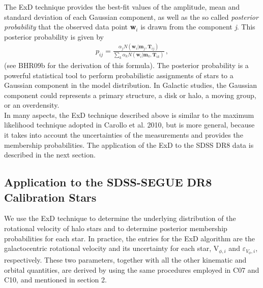 \documentclass[apj]{emulateapj}
\begin{document}
The ExD technique provides the best-fit values of the amplitude, mean
and standard deviation of each Gaussian component, as well as the so
called {\it posterior probability} that the observed data point
\textbf{w$_{i}$} is drawn from the component \emph{j}. This posterior
probability is given by
\begin{eqnarray}
p_{ij} = \frac{\alpha_{j}N(\textbf{w$_{i}$}|\textbf{m$_{j}$},\textbf{T$_{ij}$})}{\sum_{k}\alpha_{k}N(\textbf{w$_{i}$}|\textbf{m$_{k}$},\textbf{T$_{ik}$})}\,,
\end{eqnarray}
(see BHR09b for the derivation of this formula). The posterior
probability is a powerful statistical tool to perform probabilistic
assignments of stars to a Gaussian component in the model
distribution. In Galactic studies, the Gaussian component could
represents a primary structure, a disk or halo, a moving group, or an
overdensity.\\

In many aspects, the ExD technique described above is similar to the
maximum likelihood technique adopted in Carollo et al. 2010, but is
more general, because it takes into account the uncertainties of the
measurements and provides the membership probabilities. The
application of the ExD to the SDSS DR8 data is described in the next
section.

\subsection{Application to the SDSS-SEGUE DR8 Calibration Stars}

We use the ExD technique to determine the underlying distribution of
the rotational velocity of halo stars and to determine posterior
membership probabilities for each star. In practice, the entries for
the ExD algorithm are the galactocentric rotational velocity and its
uncertainty for each star, V$_{\phi,i}$ and
$\varepsilon_{V_{\phi},i}$, respectively. These two parameters,
together with all the other kinematic and orbital quantities, are
derived by using the same procedures employed in C07 and C10, and
mentioned in section 2. 
\end{document}
